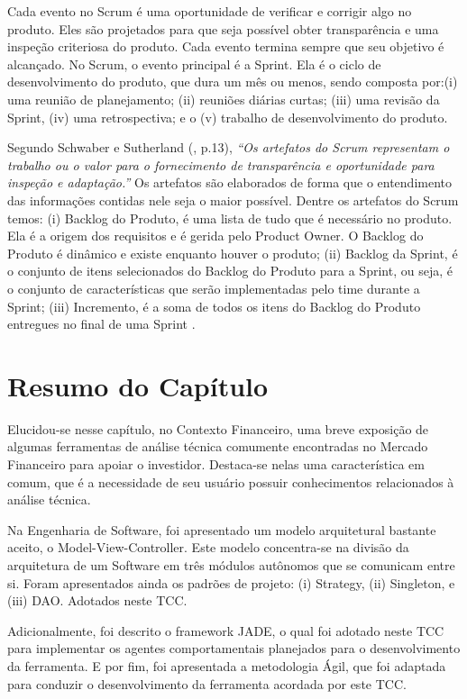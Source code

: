 Cada evento no Scrum é uma oportunidade de verificar e corrigir algo no produto. Eles são projetados para que seja possível obter transparência e uma inspeção criteriosa do produto. Cada evento termina sempre que seu objetivo é alcançado. No Scrum, o evento principal é a Sprint. Ela é o ciclo de desenvolvimento do produto, que dura um mês ou menos, sendo composta por:(i) uma reunião de planejamento; (ii) reuniões diárias curtas; (iii) uma revisão da Sprint, (iv) uma retrospectiva; e o  (v) trabalho de desenvolvimento do produto.

Segundo Schwaber e Sutherland (\citeyear{schwaber2013}, p.13), \textit{“Os artefatos do Scrum representam o trabalho ou o valor para o fornecimento de transparência e oportunidade para inspeção e adaptação.”} Os artefatos são elaborados de forma que o entendimento das informações contidas nele seja o maior possível. Dentre os artefatos do Scrum temos: (i) Backlog do Produto, é uma lista de tudo que é necessário no produto. Ela é a origem dos requisitos e é gerida pelo Product Owner. O Backlog do Produto é dinâmico e existe enquanto houver o produto; (ii) Backlog da Sprint, é o conjunto de itens selecionados do Backlog do Produto para a Sprint, ou seja, é o conjunto de características que serão implementadas pelo time durante a Sprint; (iii) Incremento, é a soma de todos os itens do Backlog do Produto entregues no final de uma Sprint \cite[p. 13-15]{schwaber2013}. 


\section{Resumo do Capítulo}

Elucidou-se nesse capítulo, no Contexto Financeiro, uma breve exposição de algumas ferramentas de análise técnica comumente encontradas no Mercado Financeiro para apoiar o investidor. Destaca-se nelas uma característica em comum, que é a necessidade de seu usuário possuir conhecimentos relacionados à análise técnica. 

Na Engenharia de Software, foi apresentado um modelo arquitetural bastante aceito, o Model-View-Controller. Este modelo concentra-se na divisão da arquitetura de um Software em três módulos autônomos que se comunicam entre si. Foram apresentados ainda os padrões de projeto: (i) Strategy, (ii) Singleton, e (iii) DAO. Adotados neste TCC. 

Adicionalmente, foi descrito o framework JADE, o qual foi adotado neste TCC para implementar os agentes comportamentais planejados para o desenvolvimento da ferramenta. E por fim, foi apresentada a metodologia Ágil, que foi adaptada para conduzir o desenvolvimento da ferramenta acordada por este TCC.

